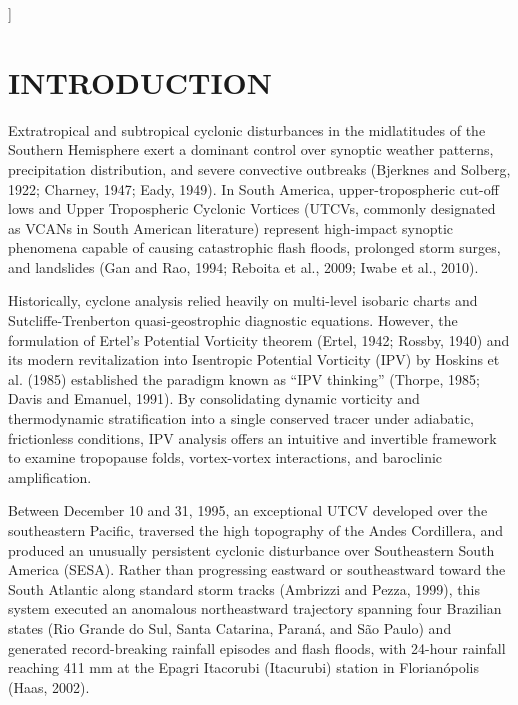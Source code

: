 \documentclass[twocolumn,a4paper,10pt]{article}
\begin{document}
\begin{@twocolumnfalse}
\begin{abstract}
\vspace{0.3cm} \\
\textbf{Palavras-chave:} V\'ortice Cicl\^onico de Altos N\'iveis; Pensamento VPI; Ciclog\^enese a Sotavento; Instabilidade Barotr\'opica; Inunda\c{c}\~oes Bruscas; ERA5.
    \end{abstract}
    \vspace{0.5cm}
  \end{@twocolumnfalse}
]

\section{INTRODUCTION}
Extratropical and subtropical cyclonic disturbances in the midlatitudes of the Southern Hemisphere exert a dominant control over synoptic weather patterns, precipitation distribution, and severe convective outbreaks (Bjerknes and Solberg, 1922; Charney, 1947; Eady, 1949). In South America, upper-tropospheric cut-off lows and Upper Tropospheric Cyclonic Vortices (UTCVs, commonly designated as VCANs in South American literature) represent high-impact synoptic phenomena capable of causing catastrophic flash floods, prolonged storm surges, and landslides (Gan and Rao, 1994; Reboita et al., 2009; Iwabe et al., 2010).

Historically, cyclone analysis relied heavily on multi-level isobaric charts and Sutcliffe-Trenberton quasi-geostrophic diagnostic equations. However, the formulation of Ertel's Potential Vorticity theorem (Ertel, 1942; Rossby, 1940) and its modern revitalization into Isentropic Potential Vorticity (IPV) by Hoskins et al. (1985) established the paradigm known as ``IPV thinking'' (Thorpe, 1985; Davis and Emanuel, 1991). By consolidating dynamic vorticity and thermodynamic stratification into a single conserved tracer under adiabatic, frictionless conditions, IPV analysis offers an intuitive and invertible framework to examine tropopause folds, vortex-vortex interactions, and baroclinic amplification.

Between December 10 and 31, 1995, an exceptional UTCV developed over the southeastern Pacific, traversed the high topography of the Andes Cordillera, and produced an unusually persistent cyclonic disturbance over Southeastern South America (SESA). Rather than progressing eastward or southeastward toward the South Atlantic along standard storm tracks (Ambrizzi and Pezza, 1999), this system executed an anomalous northeastward trajectory spanning four Brazilian states (Rio Grande do Sul, Santa Catarina, Paran\'a, and S\~ao Paulo) and generated record-breaking rainfall episodes and flash floods, with 24-hour rainfall reaching 411 mm at the Epagri Itacorubi (Itacurubi) station in Florianópolis (Haas, 2002).
\end{document}
